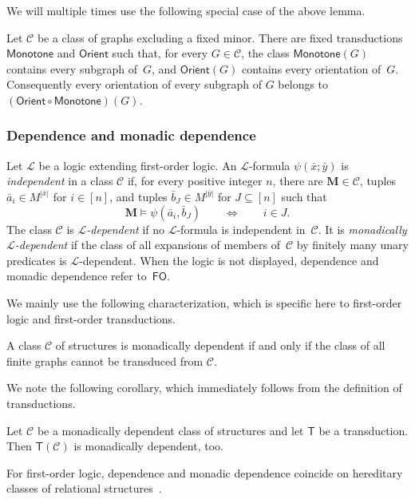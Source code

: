 \documentclass[1p,number,11pt]{elsarticle}
\theoremstyle{plain}
\newcommand{\Cc}{\mathscr{C}}
\renewcommand{\FO}{\ensuremath{\mathsf{FO}}}
\begin{document}
We will multiple times use the following special case of the above lemma. 

\begin{corollary}
Let $\Cc$ be a class of graphs excluding a fixed minor.  There are fixed
transductions $\mathsf{Monotone}$ and $\mathsf{Orient}$ such that, for every
$G\in\Cc$, the class $\mathsf{Monotone}(G)$ contains every subgraph
of~$G$, and $\mathsf{Orient}(G)$ contains every orientation of~$G$.
Consequently every orientation of every subgraph of $G$ belongs to
$(\mathsf{Orient}\circ\mathsf{Monotone})(G)$.
\end{corollary}


\subsubsection{Dependence and monadic dependence}
Let $\mathcal L$ be a logic extending first-order logic.  An
$\mathcal L$-formula $\psi(\bar x;\bar y)$ is \emph{independent} in a class
$\Cc$ if, for every positive integer $n$, there are $\mathbf M\in\Cc$, tuples $\bar a_i\in M^{|\bar x|}$ for $i\in[n]$, and tuples $\bar b_J\in M^{|\bar y|}$ for $J\subseteq[n]$ such that
\[
\mathbf M\models \psi(\bar a_i,\bar b_J)\qquad\iff\qquad i\in J.
\]
The class $\Cc$ is \emph{$\mathcal L$-dependent} if no
$\mathcal L$-formula is independent in~$\Cc$.  It is \emph{monadically
$\mathcal L$-dependent} if the class of all expansions of members of~$\Cc$
by finitely many unary predicates is $\mathcal L$-dependent.  When the logic
is not displayed, dependence and monadic dependence refer to~$\FO$.

We mainly use the following characterization, which is specific here to
first-order logic and first-order transductions.
\begin{theorem}
A class $\Cc$ of structures is monadically dependent if and only if the class
of all finite graphs cannot be transduced from $\Cc$.
\end{theorem}


We note the following corollary, which immediately follows from the definition of transductions.

\begin{corollary}
    \label{lem:dep-preserved}
    Let $\Cc$ be a monadically dependent class of structures and let $\mathsf T$ be a transduction. 
    Then  $\mathsf T(\Cc)$ is  monadically dependent, too. 
\end{corollary}

For first-order logic, dependence and monadic dependence coincide on
hereditary classes of relational structures~\cite{braunfeld2022existential}. 
\end{document}
